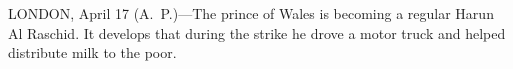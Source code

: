 
LONDON, April 17 (A.~P.)---The prince of Wales is becoming a regular
Harun Al Raschid.  It develops that during the strike he drove a motor
truck and helped distribute milk to the poor.
